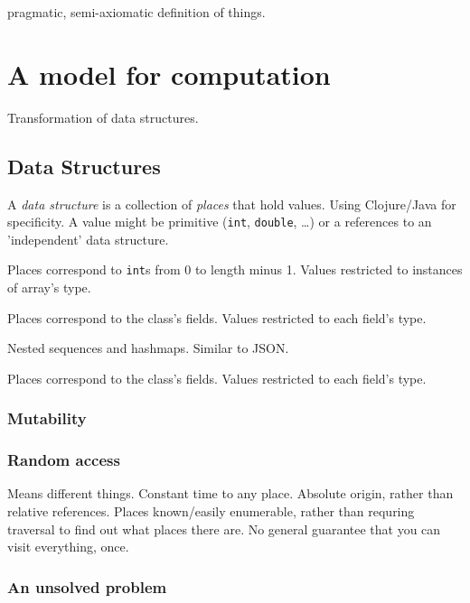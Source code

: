 \documentclass[10pt,openany]{book}
\begin{document}
pragmatic, semi-axiomatic definition of things.

\chapter{A model for computation}		

Transformation of data structures.

\section{Data Structures}

A \textit{data structure} is a collection of \textit{places}
that hold values. 
Using Clojure/Java for specificity.
A value might be primitive
(\texttt{int}, \texttt{double}, \ldots)
or a references to an 'independent' data structure.

\begin{example}
Places correspond to \texttt{int}s from 0 to length minus 1.
Values restricted to instances of array's type.
\end{example}  

\begin{example}
Places correspond to the class's fields.
Values restricted to each field's type.
\end{example}  

\begin{example}
Nested sequences and hashmaps. Similar to JSON.

Places correspond to the class's fields.
Values restricted to each field's type.
\end{example}  

\subsection{Mutability}
\subsection{Random access}

Means different things. 
Constant time to any place.
Absolute origin, rather than relative references.
Places known/easily enumerable, rather than requring traversal
to find out what places there are.
No general guarantee that you can visit everything, once.

\subsection{An unsolved problem}
\end{document}
